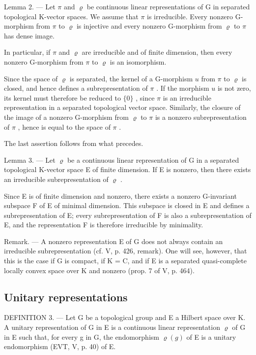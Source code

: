 Lemma 2. --- Let \(\pi\) and \(\varrho\) be continuous linear representations of G in separated topological K-vector spaces. We assume that \(\pi\) is irreducible. Every nonzero G-morphism from \(\pi\) to \(\varrho\) is injective and every nonzero G-morphism from \(\varrho\) to \(\pi\) has dense image.

In particular, if \(\pi\) and \(\varrho\) are irreducible and of finite dimension, then every nonzero G-morphism from \(\pi\) to \(\varrho\) is an isomorphism.

Since the space of \(\varrho\) is separated, the kernel of a G-morphism \(u\) from \(\pi\) to \(\varrho\) is closed, and hence defines a subrepresentation of \(\pi\) . If the morphism \(u\) is not zero, its kernel must therefore be reduced to \(\{0\}\) , since \(\pi\) is an irreducible representation in a separated topological vector space. Similarly, the closure of the image of a nonzero G-morphism from \(\varrho\) to \(\pi\) is a nonzero subrepresentation of \(\pi\) , hence is equal to the space of \(\pi\) .

The last assertion follows from what precedes.

Lemma 3. --- Let \(\varrho\) be a continuous linear representation of G in a separated topological K-vector space E of finite dimension. If E is nonzero, then there exists an irreducible subrepresentation of \(\varrho\) .

Since E is of finite dimension and nonzero, there exists a nonzero G-invariant subspace F of E of minimal dimension. This subspace is closed in E and defines a subrepresentation of E; every subrepresentation of F is also a subrepresentation of E, and the representation F is therefore irreducible by minimality.

Remark. --- A nonzero representation E of G does not always contain an irreducible subrepresentation (cf. V, p. 426, remark). One will see, however, that this is the case if G is compact, if K = C, and if E is a separated quasi-complete locally convex space over K and nonzero (prop. 7 of V, p. 464).

\subsection{Unitary representations}

DEFINITION 3. --- Let G be a topological group and E a Hilbert space over K. A unitary representation of G in E is a continuous linear representation \(\varrho\) of G in E such that, for every g in G, the endomorphism \(\varrho(g)\) of E is a unitary endomorphism (EVT, V, p. 40) of E.

